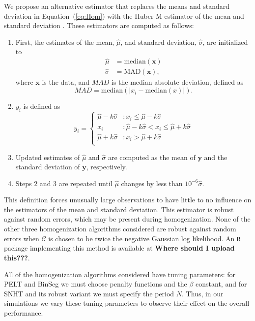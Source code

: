 \documentclass[12pt]{article}
\def\ni{\noindent}
\begin{document}
\begin{doublespacing}
We propose an alternative estimator that replaces the means and standard deviation in Equation~(\ref{eq:Hom}) with the Huber M-estimator of the mean and standard deviation \cite{huber11}.  These estimators are computed as follows:
\begin{enumerate}
	\item First, the estimates of the mean, $\hat{\mu}$, and standard deviation, $\hat{\sigma}$, are initialized to
	\begin{align*}
		\hat{\mu} &= \mbox{median}(\mathbf{x})\\
		\hat{\sigma} &= \mbox{MAD}(\mathbf{x}),
	\end{align*}
	where $\mathbf{x}$ is the data, and $MAD$ is the median absolute deviation, defined as
	\begin{equation*}
		MAD = \mbox{median}( \lvert x_i - \mbox{median}(x) \rvert ).
	\end{equation*}
	\item $y_i$ is defined as
	\begin{equation*}
		y_i = \left\{ \begin{array}{ll}
			\hat{\mu}-k \hat{\sigma} & : x_i \leq \hat{\mu}-k \hat{\sigma}\\
			x_i & : \hat{\mu}-k \hat{\sigma} < x_i \leq \hat{\mu}+k \hat{\sigma}\\
			\hat{\mu}+k \hat{\sigma} & : x_i > \hat{\mu}+k \hat{\sigma}\\
		\end{array} \right.
	\end{equation*}
	\item Updated estimates of $\hat{\mu}$ and $\hat{\sigma}$ are computed as the mean of $\mathbf{y}$ and the standard deviation of $\mathbf{y}$, respectively.
	\item Steps 2 and 3 are repeated until $\hat{\mu}$ changes by less than $10^{-6} \hat{\sigma}$.
\end{enumerate}

\ni This definition forces unusually large observations to have little to no influence on the estimators of the mean and standard deviation.    This estimator is robust against random errors, which may be present during homogenization.  None of the other three homogenization algorithms considered are robust against random errors when $\mathcal{C}$ is chosen to be twice the negative Gaussian log likelihood.  An \texttt{R} package implementing this method is available at \textbf{Where should I upload this???}.

All of the homogenization algorithms considered have tuning parameters: for PELT and BinSeg we must choose penalty functions and the $\beta$ constant, and for SNHT and its robust variant we must specify the period $N$.  Thus, in our simulations we vary these tuning parameters to observe their effect on the overall performance.


\end{doublespacing}
\end{document}

